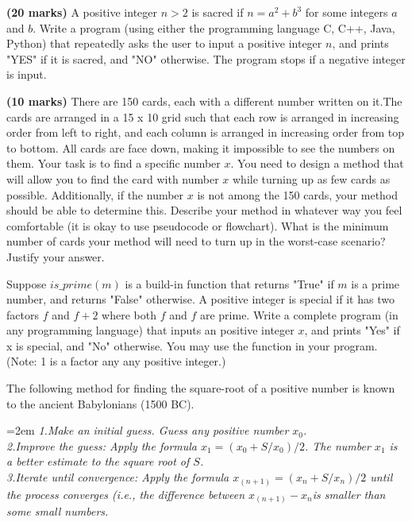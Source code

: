 \documentclass{article}
\begin{document}
\noindent\textbf{(20 marks)} A positive integer \(n > 2\) is sacred if \(n = a^2 + b^3\) for some integers \(a\) and \(b\). Write a program (using either the programming language C, C++, Java, Python) that repeatedly asks the user to input a positive integer \(n\), and prints "YES" if it is sacred, and "NO" otherwise. The program stops if a negative integer is input.

\vspace{2\baselineskip} %

\noindent\textbf{(10 marks)} There are 150 cards, each with a different number written on it.The cards are arranged in a 15 x 10 grid such that each row is arranged in increasing order from left to right, and each column is arranged in increasing order from top to bottom. All cards are face down, making it impossible to see the numbers on them. Your task is to find a specific number $x$. You need to design a method that will allow you to find the card with number $x$ while turning up as few cards as possible. Additionally, if the number $x$ is not among the 150 cards, your method should be able to determine this. Describe your method in whatever way you feel comfortable (it is okay to use pseudocode or flowchart). What is the minimum number of cards your method will need to turn up in the worst-case scenario? Justify your answer.

\vspace{2\baselineskip}

\noindent Suppose $is\_prime(m)$ is a build-in function that returns "True" if $m$ is a prime number, and returns "False" otherwise.
A positive integer is special if it has two factors $f$ and $f+2$ where both $f$ and $f$ are prime. Write a complete program (in any programming language) that inputs an positive integer $x$, and prints "Yes" if x is special, and "No" otherwise. You may use the function  in your program. (Note: 1 is a factor any any positive integer.)

\vspace{5\baselineskip}


\noindent The following method for finding the square-root of a positive number is known to the ancient Babylonians (1500 BC).

\hangindent=2em %
\textit{1.Make an initial guess. Guess any positive number $x_0$.}\\
\textit{2.Improve the guess: Apply the formula $x_1 = (x_0+S/x_0) / 2$. The number $x_1$ is a better estimate to the square root of $S$.}\\
\textit{3.Iterate until convergence: Apply the formula $x_(n+1) = (x_n+S/x_n) / 2$ until the process converges (i.e., the difference between $x_(n+1)-x_n$is smaller than some small numbers.}
\end{document}
